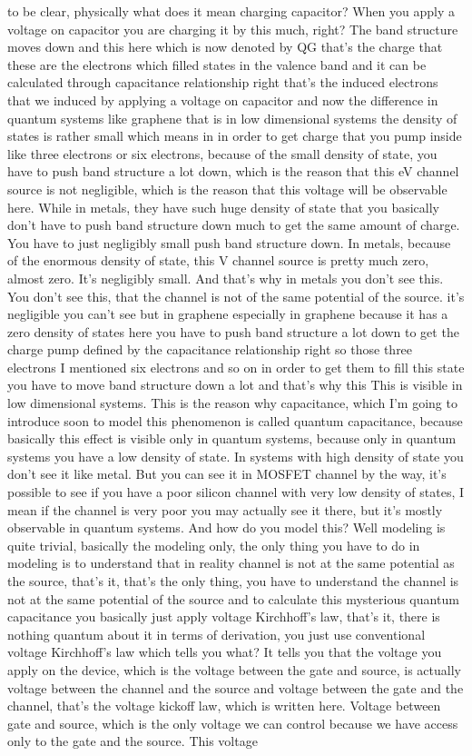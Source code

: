 to be clear, physically what does it mean charging capacitor? When you apply a voltage on capacitor you are charging it by this much, right? The band structure moves down and this here which is now denoted by QG that's the charge that these are the electrons which filled states in the valence band and it can be calculated through capacitance relationship right that's the induced electrons that we induced by applying a voltage on capacitor and now the difference in quantum systems like graphene that is in low dimensional systems the density of states is rather small which means in in order to get charge that you pump inside like three electrons or six electrons, because of the small density of state, you have to push band structure a lot down, which is the reason that this eV channel source is not negligible, which is the reason that this voltage will be observable here. While in metals, they have such huge density of state that you basically don't have to push band structure down much to get the same amount of charge. You have to just negligibly small push band structure down. In metals, because of the enormous density of state, this V channel source is pretty much zero, almost zero. It's negligibly small. And that's why in metals you don't see this. You don't see this, that the channel is not of the same potential of the source. it's negligible you can't see but in graphene especially in graphene because it has a zero density of states here you have to push band structure a lot down to get the charge pump defined by the capacitance relationship right so those three electrons I mentioned six electrons and so on in order to get them to fill this state you have to move band structure down a lot and that's why this This is visible in low dimensional systems. This is the reason why capacitance, which I'm going to introduce soon to model this phenomenon is called quantum capacitance, because basically this effect is visible only in quantum systems, because only in quantum systems you have a low density of state. In systems with high density of state you don't see it like metal. But you can see it in MOSFET channel by the way, it's possible to see if you have a poor silicon channel with very low density of states, I mean if the channel is very poor you may actually see it there, but it's mostly observable in quantum systems. And how do you model this? Well modeling is quite trivial, basically the modeling only, the only thing you have to do in modeling is to understand that in reality channel is not at the same potential as the source, that's it, that's the only thing, you have to understand the channel is not at the same potential of the source and to calculate this mysterious quantum capacitance you basically just apply voltage Kirchhoff's law, that's it, there is nothing quantum about it in terms of derivation, you just use conventional voltage Kirchhoff's law which tells you what? It tells you that the voltage you apply on the device, which is the voltage between the gate and source, is actually voltage between the channel and the source and voltage between the gate and the channel, that's the voltage kickoff law, which is written here. Voltage between gate and source, which is the only voltage we can control because we have access only to the gate and the source. This voltage 